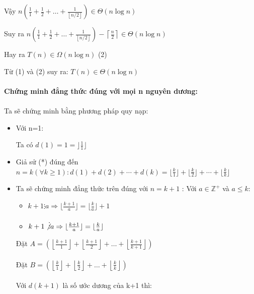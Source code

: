 \documentclass[12pt,a4paper]{article}
\begin{document}
\begin{enumerate}[label=\textbf{Câu 1:} ]
\begin{enumerate}[label=\alph*)]
\begin{itemize}[label=$\bullet$]
Vậy $n \left( \frac{1}{1} + \frac{1}{2} + \ldots + \frac{1}{\left\lfloor n/2 \right\rfloor} \right) \in \Theta(n \log n)$

Suy ra $n \left( \frac{1}{1} + \frac{1}{2} + \ldots + \frac{1}{\left\lfloor n/2 \right\rfloor} \right) - \left\lceil \frac{n}{2} \right\rceil \in \Theta(n \log n)$

Hay ra $T(n) \in \Omega(n \log n)$ (2)
\end{itemize}
Từ (1) và (2) suy ra: $T(n) \in \Theta(n \log n)$\\ \\
\textbf{Chứng minh đẳng thức đúng với mọi n nguyên dương:}\\ \\
                    Ta sẽ chứng minh bằng phương pháp quy nạp:
                    \begin{itemize}[label=$\bullet$]
                        \item Với n=1:
                              \begin{adjustwidth}{1cm}{}
                                  Ta có $d(1)=1= \rfloor \frac{1}{1} \rfloor$
                              \end{adjustwidth}
                        \item Giả sử (*) đúng đến $n=k (\forall k\geq 1): d(1)+d(2)+\cdots+d(k)=\lfloor \frac{k}{1} \rfloor+\lfloor \frac{k}{2} \rfloor+\cdots+\lfloor \frac{k}{k} \rfloor$\\
                        \item Ta sẽ chứng minh đẳng thức trên đúng  với $n=k+1 $ :
                              Với $a\in \mathbb{Z^+} $ và $a\leq k:$
                              \begin{itemize}[label=$\bullet$]
                                  \item $k+1 \vdots a \Rightarrow \lfloor\frac{k+1}{a}\rfloor = \lfloor\frac{k}{a}\rfloor+ 1$
                                  \item $k+1 \not\vdots a \Rightarrow \lfloor\frac{k+1}{a}\rfloor = \lfloor\frac{k}{a}\rfloor$
                              \end{itemize}
                              Đặt $A=\left( \left\lfloor \frac{k+1}{1} \right\rfloor + \left\lfloor \frac{k+1}{2} \right\rfloor + \ldots + \left\lfloor \frac{k+1}{k+1} \right\rfloor \right)$\\ \\
                              Đặt $B=\left( \left\lfloor \frac{k}{1} \right\rfloor + \left\lfloor \frac{k}{2} \right\rfloor + \ldots + \left\lfloor \frac{k}{k} \right\rfloor \right)$\ \\\\
                              Với $d(k+1) $ là số ước dương của k+1 thì:
                              

\end{itemize}
\end{enumerate}
\end{enumerate}
\end{document}
